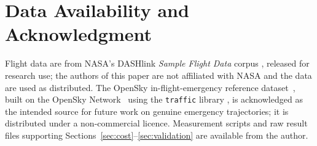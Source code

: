\documentclass[conference]{IEEEtran}
\begin{document}
\section*{Data Availability and Acknowledgment}

Flight data are from NASA's DASHlink \emph{Sample Flight Data} corpus
\cite{dashlink}, released for research use; the authors of this paper are not
affiliated with NASA and the data are used as distributed. The OpenSky
in-flight-emergency reference dataset~\cite{olive_zenodo,olive2020}, built on
the OpenSky Network~\cite{schafer2014} using the \texttt{traffic} library
\cite{olive2019}, is acknowledged as the intended source for future work on
genuine emergency trajectories; it is distributed under a non-commercial
licence. Measurement scripts and raw result files supporting
Sections~\ref{sec:cost}--\ref{sec:validation} are available from the author.
\end{document}
